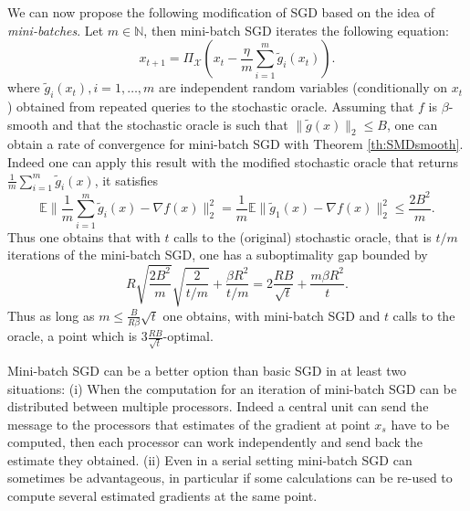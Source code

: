 \documentclass[openany]{now}
\newcommand{\tg}{\tilde{g}}
\newcommand{\E}{\mathbb{E}}
\newcommand{\N}{\mathbb{N}}
\newcommand{\cX}{\mathcal{X}}
\renewcommand{\tilde}{\widetilde}
\begin{document}
We can now propose the following modification of SGD based on the idea of {\em mini-batches}. Let $m \in \N$, then mini-batch SGD iterates the following equation:
$$x_{t+1} = \Pi_{\cX}\left(x_t - \frac{\eta}{m} \sum_{i=1}^m \tg_i(x_t)\right).$$
where $\tg_i(x_t), i=1,\hdots,m$ are independent random variables (conditionally on $x_t$) obtained from repeated queries to the stochastic oracle. Assuming that $f$ is $\beta$-smooth and that the stochastic oracle is such that $\|\tg(x)\|_2 \leq B$, one can obtain a rate of convergence for mini-batch SGD with Theorem \ref{th:SMDsmooth}. Indeed one can apply this result with the modified stochastic oracle that returns $\frac{1}{m} \sum_{i=1}^m \tg_i(x)$, it satisfies
$$\E \| \frac1{m} \sum_{i=1}^m \tg_i(x) - \nabla f(x) \|_2^2 = \frac{1}{m}\E \| \tg_1(x) - \nabla f(x) \|_2^2 \leq \frac{2 B^2}{m} .$$
Thus one obtains that with $t$ calls to the (original) stochastic oracle, that is $t/m$ iterations of the mini-batch SGD, one has a suboptimality gap bounded by
$$R \sqrt{\frac{2 B^2}{m}} \sqrt{\frac{2}{t/m}} + \frac{\beta R^2}{t/m} = 2 \frac{R B}{\sqrt{t}} + \frac{m \beta R^2}{t} .$$
Thus as long as $m \leq \frac{B}{R \beta} \sqrt{t}$ one obtains, with mini-batch SGD and $t$ calls to the oracle, a point which is $3\frac{R B}{\sqrt{t}}$-optimal.

Mini-batch SGD can be a better option than basic SGD in at least two situations: (i) When the computation for an iteration of mini-batch SGD can be distributed between multiple processors. Indeed a central unit can send the message to the processors that estimates of the gradient at point $x_s$ have to be computed, then each processor can work independently and send back the estimate they obtained. (ii) Even in a serial setting mini-batch SGD can sometimes be advantageous, in particular if some calculations can be re-used to compute several estimated gradients at the same point.
\end{document}
